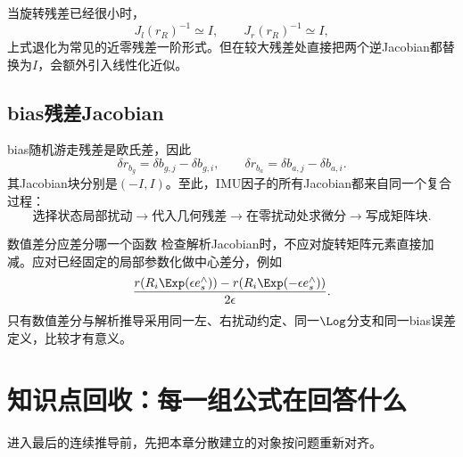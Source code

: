 当旋转残差已经很小时，
\[
    J_l(r_R)^{-1}\simeq I,
    \qquad
    J_r(r_R)^{-1}\simeq I,
\]
上式退化为常见的近零残差一阶形式。但在较大残差处直接把两个逆Jacobian都替换为$I$，会额外引入线性化近似。

\subsection{bias残差Jacobian}

bias随机游走残差是欧氏差，因此
\[
    \delta r_{b_g}=\delta b_{g,j}-\delta b_{g,i},
    \qquad
    \delta r_{b_a}=\delta b_{a,j}-\delta b_{a,i}.
\]
其Jacobian块分别是$(-I,I)$。至此，IMU因子的所有Jacobian都来自同一个复合过程：
\[
\boxed{
\text{选择状态局部扰动}
\longrightarrow
\text{代入几何残差}
\longrightarrow
\text{在零扰动处求微分}
\longrightarrow
\text{写成矩阵块}.
}
\]

\begin{imucase}{数值差分应差分哪一个函数}
检查解析Jacobian时，不应对旋转矩阵元素直接加减。应对已经固定的局部参数化做中心差分，例如
\[
    \frac{
      r(R_i\Exp(\epsilon e_s^\wedge))-r(R_i\Exp(-\epsilon e_s^\wedge))
    }{2\epsilon}.
\]
只有数值差分与解析推导采用同一左、右扰动约定、同一$\Log$分支和同一bias误差定义，比较才有意义。
\end{imucase}

\section{知识点回收：每一组公式在回答什么}

进入最后的连续推导前，先把本章分散建立的对象按问题重新对齐。


